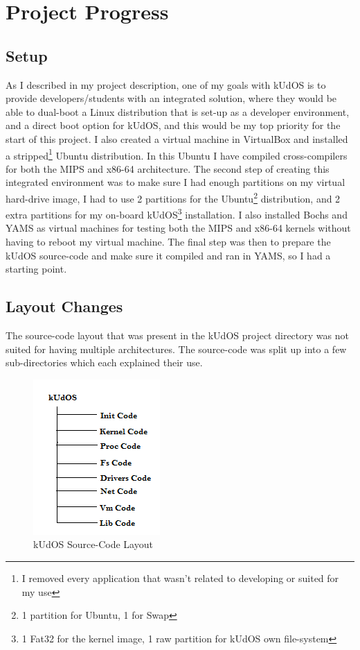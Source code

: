 \newpage
\chapter{Project Progress}

\section{Setup}

As I described in my project description, one of my goals with kUdOS is to provide developers/students with an integrated solution, where they would be able to dual-boot a Linux distribution that is set-up as a developer environment, and a direct boot option for kUdOS, and this would be my top priority for the start of this project. I also created a virtual machine in VirtualBox and installed a stripped\footnote{I removed every application that wasn't related to developing or suited for my use} Ubuntu distribution. In this Ubuntu I have compiled cross-compilers for both the MIPS and x86-64 architecture. The second step of creating this integrated environment was to make sure I had enough partitions on my virtual hard-drive image, I had to use 2 partitions for the Ubuntu\footnote{1 partition for Ubuntu, 1 for Swap} distribution, and 2 extra partitions for my on-board kUdOS\footnote{1 Fat32 for the kernel image, 1  raw partition for kUdOS own file-system} installation. I also installed Bochs and YAMS as virtual machines for testing both the MIPS and x86-64 kernels without having to reboot my virtual machine. The final step was then to prepare the kUdOS source-code and make sure it compiled and ran in YAMS, so I had a starting point.

\section{Layout Changes}

The source-code layout that was present in the kUdOS project directory was not suited for having multiple architectures. The source-code was split up into a few sub-directories which each explained their use.

\begin{figure}[h]
    \centering
    \includegraphics{DirectoryLayoutBegin.png}
    \caption{kUdOS Source-Code Layout}
    \label{fig:code_layout_end}
\end{figure}

